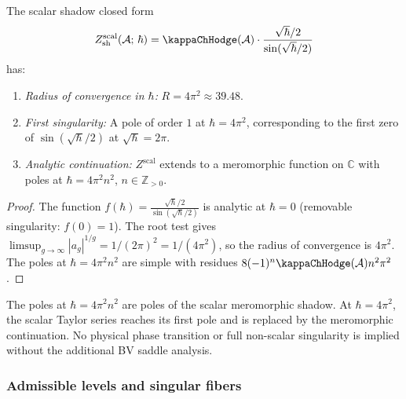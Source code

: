 \begin{proposition}
The scalar shadow closed form
\[
Z_{\mathrm{sh}}^{\mathrm{scal}}(\cA;\,\hbar)
= \kappaChHodge(\cA)\cdot
\frac{\sqrt{\hbar}/2}{\sin(\sqrt{\hbar}/2)}
\]
has:
\begin{enumerate}[label=\textup{(\roman*)}]
\item \emph{Radius of convergence in $\hbar$:} $R = 4\pi^2 \approx 39.48$.
\item \emph{First singularity:} A pole of order $1$ at $\hbar = 4\pi^2$, corresponding to the first zero of $\sin(\sqrt{\hbar}/2)$ at $\sqrt{\hbar} = 2\pi$.
\item \emph{Analytic continuation:} $Z^{\mathrm{scal}}$ extends to a meromorphic function on $\mathbb{C}$ with poles at $\hbar = 4\pi^2 n^2$, $n \in \mathbb{Z}_{> 0}$.
\end{enumerate}
\end{proposition}

\begin{proof}
The function $f(\hbar) = \frac{\sqrt{\hbar}/2}{\sin(\sqrt{\hbar}/2)}$ is analytic at $\hbar = 0$ (removable singularity: $f(0) = 1$). The root test gives $\limsup_{g \to \infty} |a_g|^{1/g} = 1/(2\pi)^2 = 1/(4\pi^2)$, so the radius of convergence is $4\pi^2$. The poles at $\hbar = 4\pi^2 n^2$ are simple with residues $8(-1)^n\kappaChHodge(\cA)n^2\pi^2$.
\end{proof}

\begin{remark}
The poles at $\hbar = 4\pi^2 n^2$ are poles of the scalar meromorphic
shadow. At $\hbar = 4\pi^2$, the scalar Taylor series reaches its
first pole and is replaced by the meromorphic continuation. No
physical phase transition or full non-scalar singularity is implied
without the additional BV saddle analysis.
\end{remark}

\subsubsection{Admissible levels and singular fibers}

